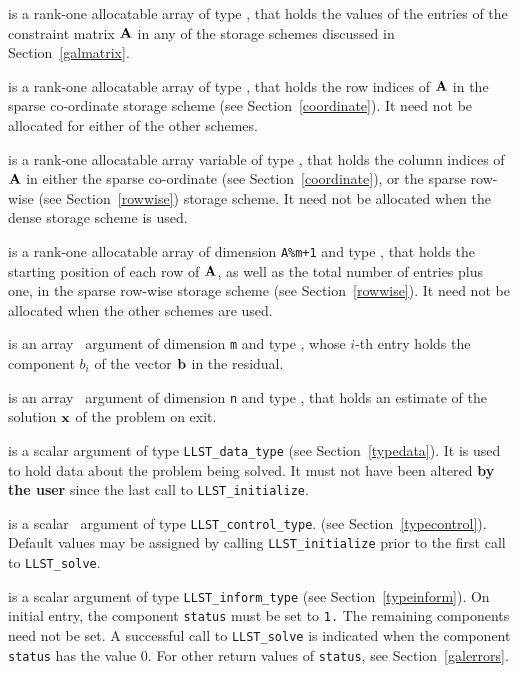 \documentclass{galahad}
\newcommand{\packagename}{LLST}
\begin{document}
\begin{description}
\begin{description}
 is a rank-one allocatable array of type \realdp, that holds
the values of the entries of the constraint matrix ${\mathbf{A}}$ in any of the
storage schemes discussed in Section~\ref{galmatrix}.

 is a rank-one allocatable array of type \integer,
that holds the row indices of ${\mathbf{A}}$ in the sparse co-ordinate storage
scheme (see Section~\ref{coordinate}).
It need not be allocated for either of the other schemes.

 is a rank-one allocatable array variable of type \integer,
that holds the column indices of ${\mathbf{A}}$ in either the sparse co-ordinate
(see Section~\ref{coordinate}), or the sparse row-wise
(see Section~\ref{rowwise}) storage scheme.
It need not be allocated when the dense storage scheme is used.

 is a rank-one allocatable array of dimension {\tt A\%m+1} and type
\integer, that holds the starting position of
each row of ${\mathbf{A}}$, as well
as the total number of entries plus one, in the sparse row-wise storage
scheme (see Section~\ref{rowwise}). It need not be allocated when the
other schemes are used.
\end{description}

 is an array \intentin\ argument of dimension {\tt m} and
type \realdp,  whose $i$-th entry holds the component $b_i$ of
the vector ${\mathbf{b}}$ in the residual.

 is an array \intentout\ argument of dimension {\tt n} and
type \realdp, that holds an estimate of the solution ${\mathbf{x}}$
of the problem on exit.

 is a scalar \intentinout argument of type
{\tt \packagename\_data\_type}
(see Section~\ref{typedata}). It is used to hold data about the problem being
solved. It must not have been altered {\bf by the user} since the last call to
{\tt \packagename\_initialize}.

 is a scalar \intentin\ argument of type
{\tt \packagename\_control\_type}.
(see Section~\ref{typecontrol}).
Default values may be assigned by calling {\tt \packagename\_initialize}
prior to the first call to {\tt \packagename\_solve}.

 is a scalar \intentinout argument of type
{\tt \packagename\_inform\_type}
(see Section~\ref{typeinform}).
On initial entry, the component {\tt status} must be set to {\tt 1.}
The remaining components need not be set.
A successful call to
{\tt \packagename\_solve}
is indicated when the  component {\tt status} has the value 0.
For other return values of {\tt status}, see Section~\ref{galerrors}.


\end{description}
\end{document}
